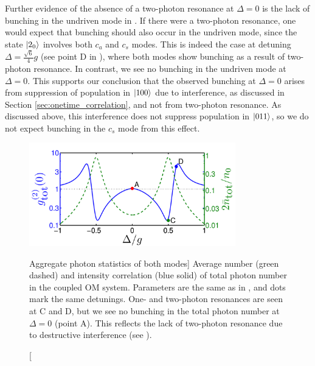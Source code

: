 Further evidence of the absence of a
two-photon resonance at $\Delta=0$ is
the lack of bunching in the undriven mode in  
.
If there were a two-photon resonance,
one would expect that bunching
should also occur in the undriven mode,
since the state $| 2_0 \rangle$ involves both $c_a$
and $c_s$ modes. 
This is indeed the case
at detuning $\Delta = \frac{\sqrt{6}}{4} g$
(see point D in ),
where
both modes show bunching as a result of
two-photon resonance.
In contrast, we see  no bunching in
the undriven mode at $\Delta = 0$. 
This supports our conclusion that the observed
bunching at $\Delta=0$ arises 
from suppression of 
population in $| 100 \rangle$ due to interference,
as discussed in Section \ref{sec:onetime_correlation},
and not from two-photon resonance.
As discussed above, this interference
does not suppress population in 
$| 011 \rangle$,
so we do not expect
bunching in the $c_s$ mode from this effect.
\begin{figure} 
\centering
  \includegraphics[width=0.8\textwidth]{./figs_Komar2013/fig3.pdf}
  \caption
  [Aggregate photon statistics of both modes]
  {
  \label{fig:populations}
  Average number (green dashed) and intensity correlation
  (blue solid)
  of total photon number in the coupled OM system.
  Parameters are the same as in ,
  and dots mark the same detunings.
  One- and two-photon resonances are
  seen at C and D,
  but we see no bunching in the
  total photon number at 
  $\Delta = 0$ (point A).
  This reflects the lack
  of two-photon resonance due to 
  destructive interference (see ).  } 
\end{figure}

